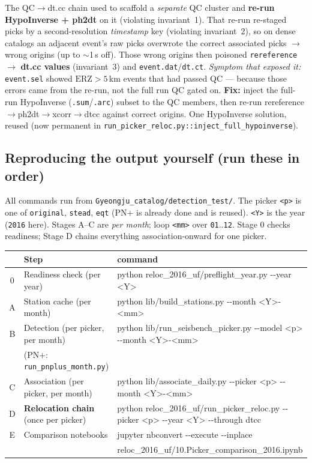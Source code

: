 \documentclass[11pt]{article}
\begin{document}
The QC$\rightarrow$dt.cc chain used to scaffold a \emph{separate} QC cluster and \textbf{re-run
HypoInverse + ph2dt} on it (violating invariant~1). That re-run re-staged picks by a second-resolution
\emph{timestamp} key (violating invariant~2), so on dense catalogs an adjacent event's raw picks
overwrote the correct associated picks $\rightarrow$ wrong origins (up to $\sim$1\,s off). Those wrong
origins then poisoned \texttt{rereference} $\rightarrow$ \textbf{dt.cc values} (invariant~3) and
\texttt{event.dat}/\texttt{dt.ct}. \emph{Symptom that exposed it:} \texttt{event.sel} showed
$\text{ERZ}>5$\,km events that had passed QC --- because those errors came from the re-run, not the full
run QC gated on. \textbf{Fix:} inject the full-run HypoInverse (\texttt{.sum}/\texttt{.arc}) subset to the
QC members, then re-run rereference$\rightarrow$ph2dt$\rightarrow$xcorr$\rightarrow$dtcc against correct
origins. One HypoInverse solution, reused (now permanent in
\texttt{run\_picker\_reloc.py::inject\_full\_hypoinverse}).

\subsection{Reproducing the output yourself (run these in order)}

All commands run from \texttt{Gyeongju\_catalog/detection\_test/}. The picker \texttt{<p>} is one of
\texttt{original}, \texttt{stead}, \texttt{eqt} (PN$+$ is already done and is reused). \texttt{<Y>} is the year
(\texttt{2016} here). Stages A--C are \emph{per month}; loop \texttt{<mm>} over \texttt{01}..\texttt{12}. Stage
0 checks readiness; Stage D chains everything association-onward for one picker.

\begin{center}
\small
\begin{tabular}{@{}c>{\raggedright\arraybackslash}p{3.3cm}>{\ttfamily\raggedright\arraybackslash}p{9.6cm}@{}}
\toprule
& Step & \normalfont command \\
\midrule
0 & Readiness check (per year) & python reloc\_2016\_uf/preflight\_year.py -{}-year <Y> \\
\midrule
A & Station cache (per month) & python lib/build\_stations.py -{}-month <Y>-<mm> \\
B & Detection (per picker, per month) & python lib/run\_seisbench\_picker.py -{}-model <p> -{}-month <Y>-<mm> \\
  & \quad (PN$+$: \texttt{run\_pnplus\_month.py}) & \\
C & Association (per picker, per month) & python lib/associate\_daily.py -{}-picker <p> -{}-month <Y>-<mm> \\
\midrule
D & \textbf{Relocation chain} (once per picker) & python reloc\_2016\_uf/run\_picker\_reloc.py -{}-picker <p> -{}-year <Y> -{}-through dtcc \\
\midrule
E & Comparison notebooks & jupyter nbconvert -{}-execute -{}-inplace \\
  & & \quad reloc\_2016\_uf/10.Picker\_comparison\_2016.ipynb \\
\bottomrule
\end{tabular}
\end{center}
\end{document}

